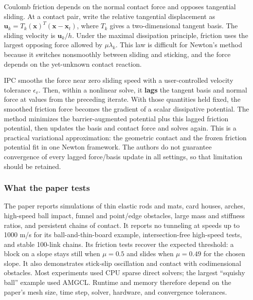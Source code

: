 \hypertarget{04-visual-computing-ii-ch029-friction-inside-the-same-solve}{}

Coulomb friction depends on the normal contact force and opposes tangential sliding. At a contact pair, write the relative tangential displacement as \(\mathbf{u}_k=T_k(\mathbf{x})^T(\mathbf{x}-\mathbf{x}_t)\), where \(T_k\) gives a two-dimensional tangent basis. The sliding velocity is \(\mathbf{u}_k/h\). Under the maximal dissipation principle, friction uses the largest opposing force allowed by \(\mu\lambda_k\). This law is difficult for Newton's method because it switches nonsmoothly between sliding and sticking, and the force depends on the yet-unknown contact reaction.

IPC smooths the force near zero sliding speed with a user-controlled velocity tolerance \(\epsilon_v\). Then, within a nonlinear solve, it \textbf{lags} the tangent basis and normal force at values from the preceding iterate. With those quantities held fixed, the smoothed friction force becomes the gradient of a scalar dissipative potential. The method minimizes the barrier-augmented potential plus this lagged friction potential, then updates the basis and contact force and solves again. This is a practical variational approximation: the geometric contact and the frozen friction potential fit in one Newton framework. The authors do not guarantee convergence of every lagged force/basis update in all settings, so that limitation should be retained.

\subsubsection{What the paper tests}\label{04-visual-computing-ii-ch029-what-the-paper-tests}

\hypertarget{04-visual-computing-ii-ch029-what-the-paper-tests}{}

The paper reports simulations of thin elastic rods and mats, card houses, arches, high-speed ball impact, funnel and point/edge obstacles, large mass and stiffness ratios, and persistent chains of contact. It reports no tunneling at speeds up to 1000 m/s for its ball-and-thin-board example, intersection-free high-speed tests, and stable 100-link chains. Its friction tests recover the expected threshold: a block on a slope stays still when \(\mu=0.5\) and slides when \(\mu=0.49\) for the chosen slope. It also demonstrates stick-slip oscillation and contact with codimensional obstacles. Most experiments used CPU sparse direct solvers; the largest ``squishy ball'' example used AMGCL. Runtime and memory therefore depend on the paper's mesh size, time step, solver, hardware, and convergence tolerances.

